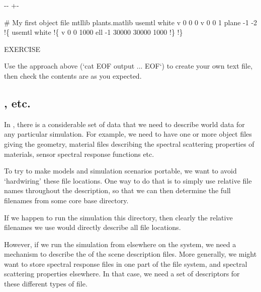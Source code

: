 \documentclass[letterpaper,10pt,english]{sphinxmanual}
\newlength\nbsphinxcodecellspacing
\begin{document}
{

\kern-\sphinxverbatimsmallskipamount\kern-\baselineskip
\kern+\FrameHeightAdjust\kern-\fboxrule
\vspace{\nbsphinxcodecellspacing}

\begin{sphinxVerbatim}[commandchars=\\\{\}]
\# My first object file
mtllib plants.matlib
usemtl white
v 0 0 0
v 0 0 1
plane -1 -2
!\{
usemtl white
!\{
v 0 0 1000
ell -1 30000 30000 1000
!\}
!\}
\end{sphinxVerbatim}
}

\begin{sphinxVerbatim}[commandchars=\\\{\}]
EXERCISE

Use the approach above (`cat \PYGZlt{}\PYGZlt{}EOF \PYGZgt{} output ... EOF`) to create your own text file, then check the contents are as you expected.
\end{sphinxVerbatim}


\subsection{,  etc.}
\label{\detokenize{Appendix1:MATLIB,-RSRLIB-etc.}}
In , there is a considerable set of data that we need to describe world data for any particular simulation. For example, we need to have one or more object files giving the geometry, material files describing the spectral scattering properties of materials, sensor spectral response functions etc.

To try to make models and simulation scenarios portable, we want to avoid ‘hardwiring’ these file locations. One way to do that is to simply use relative file names throughout the description, so that we can then determine the full filenames from some core base directory.

If we happen to run the simulation  this directory, then clearly the relative filenames we use would directly describe all file locations.

However, if we run the simulation from elsewhere on the system, we need a mechanism to describe the  of the scene description files. More generally, we might want to store spectral response files in one part of the file system, and spectral scattering properties elsewhere. In that case, we need a set of  descriptors for these different types of file.
\end{document}
